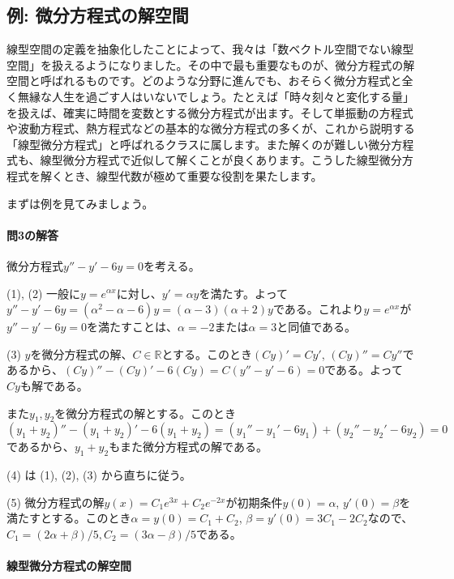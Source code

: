 \subsection{例: 微分方程式の解空間}

線型空間の定義を抽象化したことによって、我々は「数ベクトル空間でない線型空間」を扱えるようになりました。その中で最も重要なものが、微分方程式の解空間と呼ばれるものです。どのような分野に進んでも、おそらく微分方程式と全く無縁な人生を過ごす人はいないでしょう。たとえば「時々刻々と変化する量」を扱えば、確実に時間を変数とする微分方程式が出ます。そして単振動の方程式や波動方程式、熱方程式などの基本的な微分方程式の多くが、これから説明する「線型微分方程式」と呼ばれるクラスに属します。また解くのが難しい微分方程式も、線型微分方程式で近似して解くことが良くあります。こうした線型微分方程式を解くとき、線型代数が極めて重要な役割を果たします。

まずは例を見てみましょう。

\paragraph{問3の解答} 微分方程式$y'' - y' - 6y = 0$を考える。

\noindent (1), (2) 一般に$y = e^{\alpha x}$に対し、$y' = \alpha y$を満たす。よって$y'' - y' - 6y = (\alpha^2 - \alpha - 6) y = (\alpha - 3)(\alpha + 2) y$である。これより$y = e^{\alpha x}$が$y'' - y' - 6y =0$を満たすことは、$\alpha = -2$または$\alpha = 3$と同値である。

\noindent (3) $y$を微分方程式の解、$C\in \mathbb{R}$とする。このとき$(Cy)' = Cy'$, $(Cy)'' = Cy''$であるから、$(Cy)'' - (Cy)' - 6(Cy) = C(y'' - y' - 6) = 0$である。よって$Cy$も解である。

また$y_1, y_2$を微分方程式の解とする。このとき$(y_1 + y_2)'' - (y_1 + y_2)' - 6(y_1 + y_2) = (y_1'' - y_1' - 6 y_1) + (y_2'' - y_2' - 6 y_2) = 0$であるから、$y_1 + y_2$もまた微分方程式の解である。

\noindent (4) は (1), (2), (3) から直ちに従う。

\noindent (5) 微分方程式の解$y(x) = C_1 e^{3x} + C_2 e^{-2x}$が初期条件$y(0) = \alpha$, $y'(0) = \beta$を満たすとする。このとき$\alpha = y(0) = C_1 + C_2$, $\beta = y'(0) = 3C_1 - 2C_2$なので、$C_1 = (2\alpha + \beta)/5, C_2 = (3\alpha - \beta)/5$である。

\paragraph{線型微分方程式の解空間}


